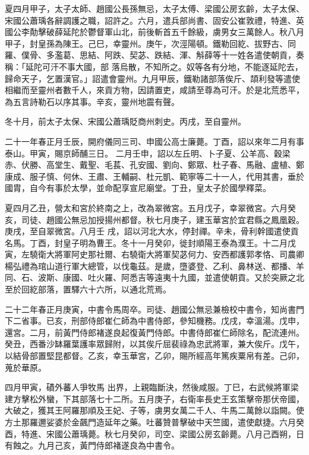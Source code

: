 \begin{pinyinscope}
 夏四月甲子，太子太師、趙國公長孫無忌，太子太傅、梁國公房玄齡，太子太保、宋國公蕭瑀各辭調護之職，詔許之。六月，遣兵部尚書、固安公崔敦禮，特進、英國公李勣擊破薛延陀於鬱督軍山北，前後斬首五千餘級，虜男女三萬餘人。秋八月甲子，封皇孫為陳王。己巳，幸靈州。庚午，次涇陽頓。鐵勒回紇、拔野古、同羅、僕骨、多濫葛、思結、阿跌、契苾、跌結、渾、斛薛等十一姓各遣使朝貢，奏稱：「延陀可汗不事大國，部
 落烏散，不知所之。奴等各有分地，不能逐延陀去，歸命天子，乞置漢官。」詔遣會靈州。九月甲辰，鐵勒諸部落俟斤、頡利發等遣使相繼而至靈州者數千人，來貢方物，因請置吏，咸請至尊為可汗。於是北荒悉平，為五言詩勒石以序其事。辛亥，靈州地震有聲。



 冬十月，前太子太保、宋國公蕭瑀貶商州刺史。丙戌，至自靈州。



 二十一年春正月壬辰，開府儀同三司、申國公高士廉薨。丁酉，詔以來年二月有事泰山。甲寅，賜京師酺三日。
 二月壬申，詔以左丘明、卜子夏、公羊高、穀梁赤、伏勝、高堂生、戴聖、毛萇、孔安國、劉向、鄭眾、杜子春、馬融、盧植、鄭康成、服子慎、何休、王肅、王輔嗣、杜元凱、範寧等二十一人，代用其書，垂於國胄，自今有事於太學，並命配享宣尼廟堂。丁丑，皇太子於國學釋菜。



 夏四月乙丑，營太和宮於終南之上，改為翠微宮。五月戊子，幸翠微宮。六月癸亥，司徒、趙國公無忌加授揚州都督。秋七月庚子，建玉華宮於宜君縣之鳳凰穀。庚戌，至自翠微宮。八月壬
 戌，詔以河北大水，停封禪。辛未，骨利幹國遣使貢名馬。丁酉，封皇子明為曹王。冬十一月癸卯，徙封順陽王泰為濮王。十二月戊寅，左驍衛大將軍阿史那社爾、右驍衛大將軍契苾何力、安西都護郭孝恪、司農卿楊弘禮為琯山道行軍大總管，以伐龜茲。是歲，墮婆登、乙利、鼻林送、都播、羊同、石、波斯、康國、吐火羅、阿悉吉等遠夷十九國，並遣使朝貢。又於突厥之北至於回紇部落，置驛六十六所，以通北荒焉。



 二十二年春正月庚寅，中書令馬周卒。司徒、趙國公無忌兼檢校中書令，知尚書門下二省事。已亥，刑部侍郎崔仁師為中書侍郎，參知機務。戊戌，幸溫湯。戊申，還宮。二月，前黃門侍郎褚遂良起復黃門侍郎。中書侍郎崔仁師除名，配流連州。癸丑，西番沙缽羅葉護率眾歸附，以其俟斤屈裴祿為忠武將軍，兼大俟斤。戊午，以結骨部置堅昆都督。乙亥，幸玉華宮，乙卯，賜所經高年篤疾粟帛有差。己卯，蒐於華原。



 四月甲寅，磧外蕃人爭牧馬
 出界，上親臨斷決，然後咸服。丁巳，右武候將軍梁建方擊松外蠻，下其部落七十二所。五月庚子，右衛率長史王玄策擊帝那伏帝國，大破之，獲其王阿羅那順及王妃、子等，虜男女萬二千人、牛馬二萬餘以詣闕。使方土那羅邇娑婆於金飆門造延年之藥。吐蕃贊普擊破中天竺國，遣使獻捷。六月癸酉，特進、宋國公蕭瑀薨。秋七月癸卯，司空、梁國公房玄齡薨。八月己酉朔，日有蝕之。九月己亥，黃門侍郎褚遂良為中書令。




\end{pinyinscope}

